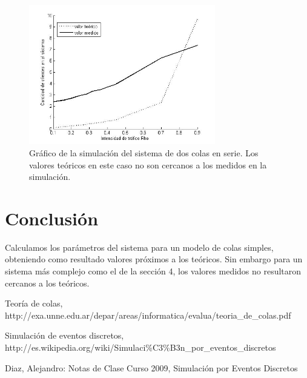 \documentclass[10pt,journal,compsoc]{IEEEtran}
\begin{document}
\begin{figure}[t]%
\label{fig:puntodos}
\begin{center}
\centering
\includegraphics[width=3.2in]{plot_L}
\caption{Gr\'afico de la simulaci\'on del sistema de dos colas en serie. Los valores te\'oricos en este caso no son cercanos a los medidos en la simulaci\'on.}
\end{center}
\end{figure}


\section{Conclusi\'on} %
Calculamos los par\'ametros del sistema para un modelo de colas simples, obteniendo como resultado valores
pr\'oximos a los te\'oricos. Sin embargo para un sistema m\'as complejo como el de la secci\'on 4, los
valores medidos no resultaron cercanos a los te\'oricos.

\begin{thebibliography}{1}

Teor\'ia de colas, http://exa.unne.edu.ar/depar/areas/informatica/evalua/teoria\_de\_colas.pdf

Simulaci\'on de eventos discretos, http://es.wikipedia.org/wiki/Simulaci\%C3\%B3n\_por\_eventos\_discretos

Diaz, Alejandro: Notas de Clase Curso 2009, Simulaci\'on por Eventos Discretos


\end{thebibliography}
\end{document}
